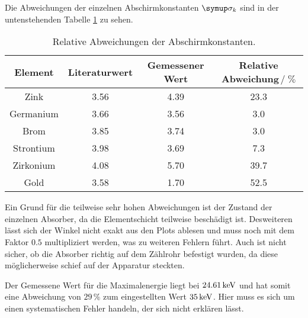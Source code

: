 
Die Abweichungen der einzelnen Abschirmkonstanten $\su{\sigma_k}$ sind in der
untenstehenden Tabelle \ref{tab:abw} zu sehen.
\begin{table}
  \centering
  \begin{tabular}{c c c c }
    \toprule
    Element & Literaturwert & Gemessener Wert & Relative Abweichung$\,/\;\%$ \\
    \midrule
    Zink       & 3.56 & 4.39 & 23.3 \\
    Germanium  & 3.66 & 3.56 &  3.0 \\
    Brom       & 3.85 & 3.74 &  3.0 \\
    Strontium  & 3.98 & 3.69 &  7.3 \\
    Zirkonium  & 4.08 & 5.70 & 39.7 \\
    Gold       & 3.58 & 1.70 & 52.5 \\
    \bottomrule
  \end{tabular}
  \caption{Relative Abweichungen der Abschirmkonstanten.}
  \label{tab:abw}
\end{table}
Ein Grund für die teilweise sehr hohen Abweichungen ist der Zustand der einzelnen
Absorber, da die Elementschicht teilweise beschädigt ist. Desweiteren lässt sich
der Winkel nicht exakt aus den Plots ablesen und muss noch mit dem Faktor $0.5$ multipliziert
werden, was zu weiteren Fehlern führt. Auch ist nicht
sicher, ob die Absorber richtig auf dem Zählrohr befestigt wurden, da diese möglicherweise
schief auf der Apparatur steckten.

Der Gemessene Wert für die Maximalenergie liegt bei $24.61\,\si{\kilo\electronvolt}$ und hat somit
eine Abweichung von $29\,\%$ zum eingestellten Wert $35\,\si{\kilo\electronvolt}$. Hier muss es sich
um einen systematischen Fehler handeln, der sich nicht erklären lässt.
